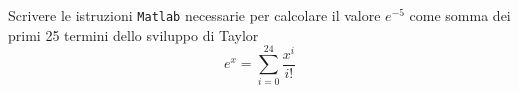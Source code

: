 Scrivere le istruzioni {\tt Matlab} necessarie per calcolare il valore $e^{-5}$
come somma dei primi 25 termini dello sviluppo di Taylor
\[ e^x = \sum_{i=0}^{24}  \frac{x^i}{i!}  \]


